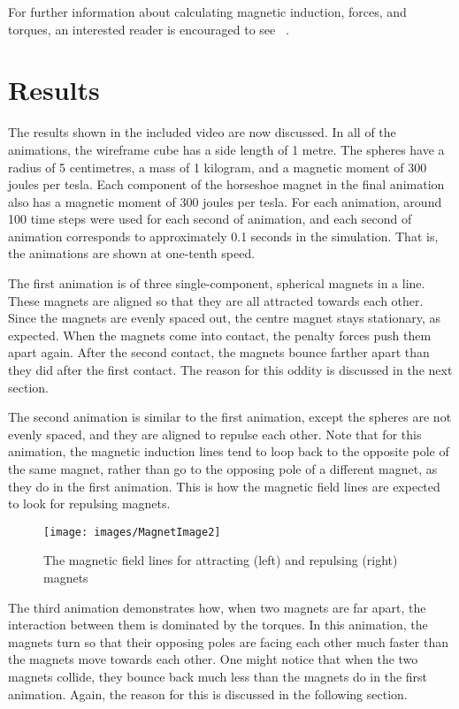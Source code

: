 \documentclass[tog]{acmsiggraph}
\begin{document}
For further information about calculating magnetic induction, forces, and torques, an interested reader is encouraged to see ~\cite{Thomaszewski:2008:MIM}.

\section{Results}

The results shown in the included video are now discussed. In all of the animations, the wireframe cube has a side length of 1 metre. The spheres have a radius of 5 centimetres, a mass of 1 kilogram, and a magnetic moment of 300 joules per tesla. Each component of the horseshoe magnet in the final animation also has a magnetic moment of 300 joules per tesla. For each animation, around 100 time steps were used for each second of animation, and each second of animation corresponds to approximately 0.1 seconds in the simulation. That is, the animations are shown at one-tenth speed.

The first animation is of three single-component, spherical magnets in a line. These magnets are aligned so that they are all attracted towards each other. Since the magnets are evenly spaced out, the centre magnet stays stationary, as expected. When the magnets come into contact, the penalty forces push them apart again. After the second contact, the magnets bounce farther apart than they did after the first contact. The reason for this oddity is discussed in the next section.

The second animation is similar to the first animation, except the spheres are not evenly spaced, and they are aligned to repulse each other. Note that for this animation, the magnetic induction lines tend to loop back to the opposite pole of the same magnet, rather than go to the opposing pole of a different magnet, as they do in the first animation. This is how the magnetic field lines are expected to look for repulsing magnets.

\begin{figure}[ht]
  \centering
  \texttt{[image: images/MagnetImage2]}
  \caption{The magnetic field lines for attracting (left) and repulsing (right) magnets}
\end{figure}

The third animation demonstrates how, when two magnets are far apart, the interaction between them is dominated by the torques. In this animation, the magnets turn so that their opposing poles are facing each other much faster than the magnets move towards each other. One might notice that when the two magnets collide, they bounce back much less than the magnets do in the first animation. Again, the reason for this is discussed in the following section.
\end{document}
